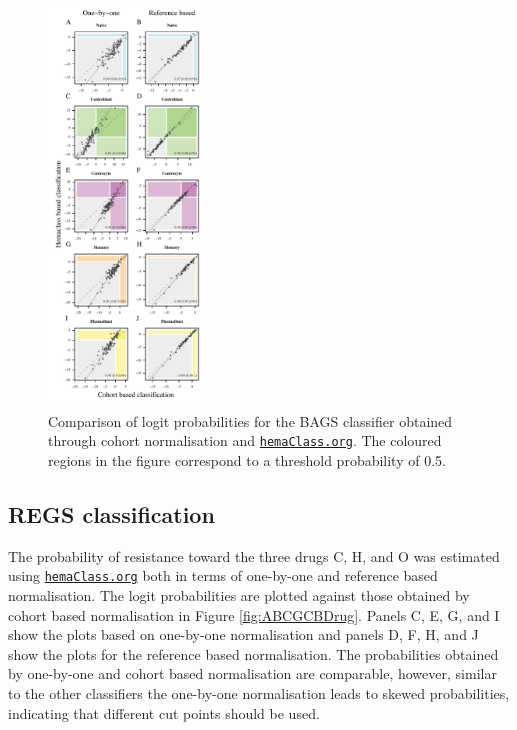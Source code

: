 \documentclass{article}
\newcommand{\hemaClass}{\href{http://hemaClass.org}{\texttt{hemaClass.org}}}
\begin{document}
\begin{figure}
\begin{center}
\includegraphics[width=0.375\textwidth]{figures/BAGSlogitChep.pdf}
\end{center}
\caption{Comparison of logit probabilities for the BAGS classifier obtained through cohort normalisation and \hemaClass{}.
The coloured regions in the figure correspond to a threshold probability of 0.5.}
\label{fig:Bagscorr}
\end{figure}
\newpage


\subsection{REGS classification}

The probability of resistance toward the three drugs C, H, and O was estimated using \hemaClass{} both in terms of one-by-one and reference based normalisation.
The logit probabilities are plotted against those obtained by cohort based normalisation in Figure \ref{fig:ABCGCBDrug}.
Panels C, E, G, and I show the plots based on one-by-one normalisation and panels D, F, H, and J show the plots for the reference based normalisation.
The probabilities obtained by one-by-one and cohort based normalisation are comparable, however, similar to the other classifiers the one-by-one normalisation leads to skewed probabilities, indicating that different cut points should be used.
\end{document}
